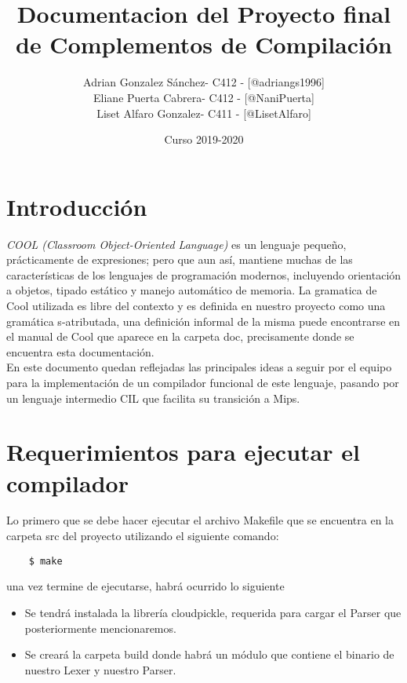 \documentclass[a4paper, 12pt]{article}
\begin{document}
\title{Documentacion del Proyecto final de Complementos de Compilación}
\date{Curso 2019-2020}

\author{  
	Adrian Gonzalez Sánchez- C412 - [@adriangs1996]\\
	Eliane Puerta Cabrera- C412 - [@NaniPuerta]\\
	Liset Alfaro Gonzalez- C411 - [@LisetAlfaro]\\
  }

\maketitle

\section{Introducción}
\textit{COOL (Classroom Object-Oriented Language)} es un lenguaje pequeño, prácticamente de expresiones; pero que aun así, 
mantiene muchas de las características de los lenguajes de programación modernos, 
incluyendo orientación a objetos, tipado estático y manejo automático de memoria. 
La gramatica de Cool utilizada es libre del contexto y es definida en nuestro proyecto como 
una gram\'atica s-atributada, una definici\'on informal de la misma
puede encontrarse en el manual de Cool que aparece en la carpeta doc, precisamente donde se encuentra esta documentación.\\
En este documento quedan reflejadas las principales ideas a seguir por el equipo para 
la implementación de un compilador funcional de este lenguaje, 
pasando por un lenguaje intermedio CIL que facilita su transición a Mips.

\section{Requerimientos para ejecutar el compilador}
Lo primero que se debe hacer ejecutar el archivo Makefile que se encuentra en la carpeta src del proyecto utilizando el siguiente
comando:
\begin{verbatim}
	$ make
\end{verbatim}

una vez termine de ejecutarse, habr\'a ocurrido lo siguiente
\begin{itemize}
	\item Se tendr\'a instalada la librería cloudpickle, requerida para cargar el Parser que posteriormente mencionaremos.
	\item Se crear\'a la carpeta build donde habr\'a un m\'odulo que contiene el binario de nuestro Lexer y nuestro Parser.
\end{itemize}
\end{document}
